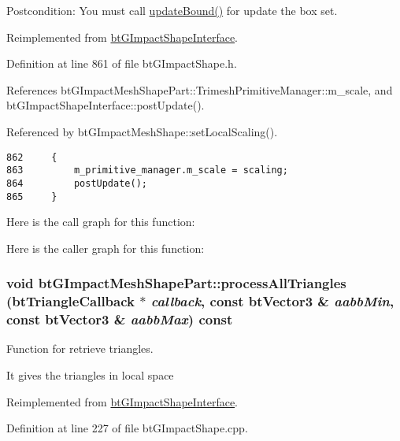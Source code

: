 \begin{Desc}
\item[Postcondition:]You must call \hyperlink{classbt_g_impact_shape_interface_cb26c2d7a2aecabd06b996b72b848492}{updateBound()} for update the box set. \end{Desc}


Reimplemented from \hyperlink{classbt_g_impact_shape_interface_dec0bd43cd0105b1d0dc172bc7db50d8}{btGImpactShapeInterface}.

Definition at line 861 of file btGImpactShape.h.

References btGImpactMeshShapePart::TrimeshPrimitiveManager::m\_\-scale, and btGImpactShapeInterface::postUpdate().

Referenced by btGImpactMeshShape::setLocalScaling().

\begin{Code}\begin{verbatim}862     {
863         m_primitive_manager.m_scale = scaling;
864         postUpdate();
865     }
\end{verbatim}
\end{Code}




Here is the call graph for this function:

Here is the caller graph for this function:\hypertarget{classbt_g_impact_mesh_shape_part_230a814ad9f784638e8bcbf0592cdd39}{
\subsubsection[processAllTriangles]{\setlength{\rightskip}{0pt plus 5cm}void btGImpactMeshShapePart::processAllTriangles ({\bf btTriangleCallback} $\ast$ {\em callback}, \/  const btVector3 \& {\em aabbMin}, \/  const btVector3 \& {\em aabbMax}) const}}
\label{classbt_g_impact_mesh_shape_part_230a814ad9f784638e8bcbf0592cdd39}


Function for retrieve triangles. 

It gives the triangles in local space 

Reimplemented from \hyperlink{classbt_g_impact_shape_interface_2faf9adce39854a9a66dd658f646be25}{btGImpactShapeInterface}.

Definition at line 227 of file btGImpactShape.cpp.

